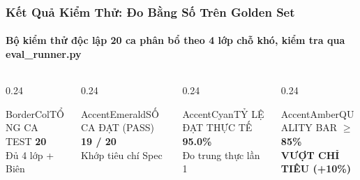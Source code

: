 \documentclass[aspectratio=169,10pt]{beamer}
\begin{document}
\begin{frame}
  \frametitle{Kết Quả Kiểm Thử: Đo Bằng Số Trên Golden Set}
  \framesubtitle{Bộ kiểm thử độc lập 20 ca phân bổ theo 4 lớp chỗ khó, kiểm tra qua eval\_runner.py}

  \begin{columns}[T]
    \begin{column}{0.24\textwidth}
      \begin{metricbox}{BorderCol}{TỔNG CA TEST}
        {\Large \textbf{\color{TextLight} 20}}\\[0.05cm]
        {\tiny \color{TextMuted} Đủ 4 lớp + Biên}
      \end{metricbox}
    \end{column}
    \begin{column}{0.24\textwidth}
      \begin{metricbox}{AccentEmerald}{SỐ CA ĐẠT (PASS)}
        {\Large \textbf{\color{AccentEmerald} 19 / 20}}\\[0.05cm]
        {\tiny \color{AccentEmerald} Khớp tiêu chí Spec}
      \end{metricbox}
    \end{column}
    \begin{column}{0.24\textwidth}
      \begin{metricbox}{AccentCyan}{TỶ LỆ ĐẠT THỰC TẾ}
        {\Large \textbf{\color{AccentCyan} 95.0\%}}\\[0.05cm]
        {\tiny \color{AccentCyan} Đo trung thực lần 1}
      \end{metricbox}
    \end{column}
    \begin{column}{0.24\textwidth}
      \begin{metricbox}{AccentAmber}{QUALITY BAR}
        {\Large \textbf{\color{AccentAmber} $\ge$ 85\%}}\\[0.05cm]
        {\tiny \color{AccentEmerald}\textbf{VƯỢT CHỈ TIÊU (+10\%)}}
      \end{metricbox}
    \end{column}
  \end{columns}


\end{frame}
\end{document}
